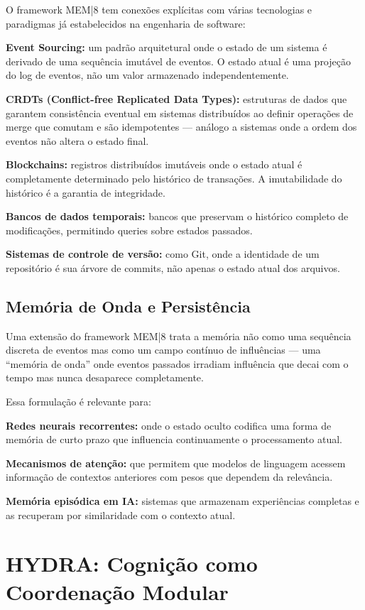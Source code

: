 \documentclass[11pt, a4paper]{article}
\theoremstyle{named}
\begin{document}
O framework MEM|8 tem conexões explícitas com várias tecnologias e
paradigmas já estabelecidos na engenharia de software:

\textbf{Event Sourcing:} um padrão arquitetural onde o estado de um
sistema é derivado de uma sequência imutável de eventos. O estado atual
é uma projeção do log de eventos, não um valor armazenado
independentemente.

\textbf{CRDTs (Conflict-free Replicated Data Types):} estruturas de
dados que garantem consistência eventual em sistemas distribuídos ao
definir operações de merge que comutam e são idempotentes — análogo
a sistemas onde a ordem dos eventos não altera o estado final.

\textbf{Blockchains:} registros distribuídos imutáveis onde o estado
atual é completamente determinado pelo histórico de transações. A
imutabilidade do histórico é a garantia de integridade.

\textbf{Bancos de dados temporais:} bancos que preservam o histórico
completo de modificações, permitindo queries sobre estados passados.

\textbf{Sistemas de controle de versão:} como Git, onde a identidade
de um repositório é sua árvore de commits, não apenas o estado atual
dos arquivos.

\subsection{Memória de Onda e Persistência}

Uma extensão do framework MEM|8 trata a memória não como uma sequência
discreta de eventos mas como um campo contínuo de influências — uma
``memória de onda'' onde eventos passados irradiam influência que
decai com o tempo mas nunca desaparece completamente.

Essa formulação é relevante para:

\textbf{Redes neurais recorrentes:} onde o estado oculto codifica uma
forma de memória de curto prazo que influencia continuamente o
processamento atual.

\textbf{Mecanismos de atenção:} que permitem que modelos de linguagem
acessem informação de contextos anteriores com pesos que dependem da
relevância.

\textbf{Memória episódica em IA:} sistemas que armazenam experiências
completas e as recuperam por similaridade com o contexto atual.

\section{HYDRA: Cognição como Coordenação Modular}
\end{document}
